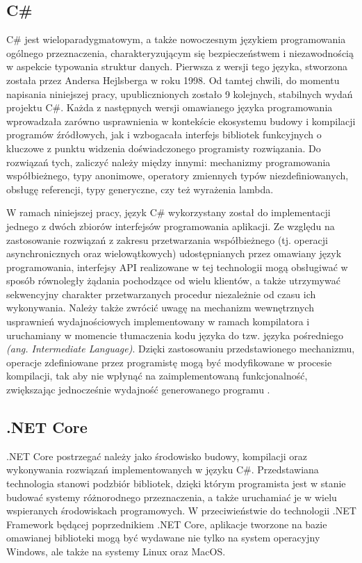 \subsection*{C\#}
C\# jest wieloparadygmatowym, a także nowoczesnym językiem programowania ogólnego przeznaczenia, charakteryzującym się bezpieczeństwem i niezawodnością w aspekcie typowania struktur danych. Pierwsza z wersji tego języka, stworzona została przez Andersa Hejlsberga w roku 1998. Od tamtej chwili, do momentu napisania niniejszej pracy, upublicznionych zostało 9 kolejnych,  stabilnych wydań projektu C\#. Każda z następnych wersji omawianego języka programowania wprowadzała zarówno usprawnienia w kontekście ekosystemu budowy i kompilacji programów źródłowych, jak i wzbogacała interfejs bibliotek funkcyjnych o kluczowe z punktu widzenia doświadczonego programisty rozwiązania. Do rozwiązań tych, zaliczyć należy między innymi: mechanizmy programowania współbieżnego, typy anonimowe, operatory zmiennych typów niezdefiniowanych, obsługę referencji, typy generyczne, czy też wyrażenia lambda. 

W ramach niniejszej pracy, język C\# wykorzystany został do implementacji jednego z dwóch zbiorów interfejsów programowania aplikacji. Ze względu na zastosowanie rozwiązań z zakresu przetwarzania współbieżnego (tj. operacji asynchronicznych oraz wielowątkowych) udostępnianych przez omawiany język programowania, interfejsy API realizowane w tej technologii mogą obsługiwać w sposób równoległy żądania pochodzące od wielu klientów, a także utrzymywać sekwencyjny charakter przetwarzanych procedur niezależnie od czasu ich wykonywania. Należy także zwrócić uwagę na mechanizm wewnętrznych usprawnień wydajnościowych implementowany w ramach kompilatora i uruchamiany w momencie tłumaczenia kodu języka do tzw. języka pośredniego \textit{(ang. Intermediate Language)}. Dzięki zastosowaniu przedstawionego mechanizmu, operacje zdefiniowane przez programistę mogą być modyfikowane w procesie kompilacji, tak aby nie wpłynąć na zaimplementowaną funkcjonalność, zwiększając jednocześnie wydajność generowanego programu \cite{hejlsberg2003c}.
\subsection*{.NET Core}
.NET Core postrzegać należy jako środowisko budowy, kompilacji oraz wykonywania rozwiązań implementowanych w języku C\#. Przedstawiana technologia stanowi podzbiór bibliotek, dzięki którym programista jest w stanie budować systemy różnorodnego przeznaczenia, a także uruchamiać je w wielu wspieranych środowiskach programowych. W przeciwieństwie do technologii .NET Framework będącej poprzednikiem .NET Core, aplikacje tworzone na bazie omawianej biblioteki mogą być wydawane nie tylko na system operacyjny Windows, ale także na systemy Linux oraz MacOS.

